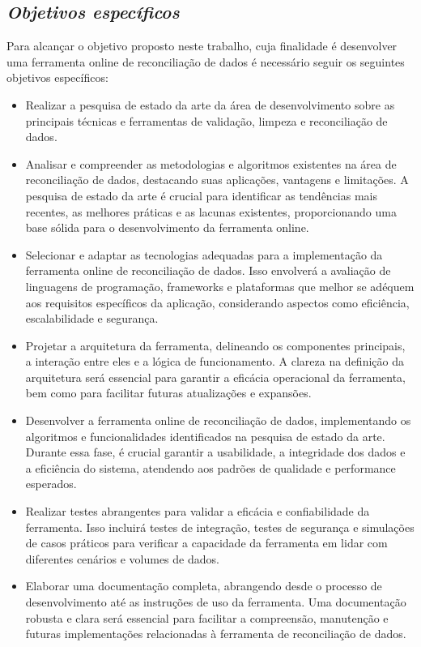 \subsection{\textit{Objetivos específicos}}

Para alcançar o objetivo proposto neste trabalho, cuja finalidade é desenvolver uma ferramenta online de reconciliação de dados é necessário seguir os seguintes objetivos específicos:

\begin{itemize}

\item Realizar a pesquisa de estado da arte da área de desenvolvimento sobre as principais técnicas e ferramentas de validação, limpeza e reconciliação de dados. 

\item Analisar e compreender as metodologias e algoritmos existentes na área de reconciliação de dados, destacando suas aplicações, vantagens e limitações. A pesquisa de estado da arte é crucial para identificar as tendências mais recentes, as melhores práticas e as lacunas existentes, proporcionando uma base sólida para o desenvolvimento da ferramenta online.

\item Selecionar e adaptar as tecnologias adequadas para a implementação da ferramenta online de reconciliação de dados. Isso envolverá a avaliação de linguagens de programação, frameworks e plataformas que melhor se adéquem aos requisitos específicos da aplicação, considerando aspectos como eficiência, escalabilidade e segurança.

\item Projetar a arquitetura da ferramenta, delineando os componentes principais, a interação entre eles e a lógica de funcionamento. A clareza na definição da arquitetura será essencial para garantir a eficácia operacional da ferramenta, bem como para facilitar futuras atualizações e expansões.

\item Desenvolver a ferramenta online de reconciliação de dados, implementando os algoritmos e funcionalidades identificados na pesquisa de estado da arte. Durante essa fase, é crucial garantir a usabilidade, a integridade dos dados e a eficiência do sistema, atendendo aos padrões de qualidade e performance esperados.

\item Realizar testes abrangentes para validar a eficácia e confiabilidade da ferramenta. Isso incluirá testes de integração, testes de segurança e simulações de casos práticos para verificar a capacidade da ferramenta em lidar com diferentes cenários e volumes de dados.

\item Elaborar uma documentação completa, abrangendo desde o processo de desenvolvimento até as instruções de uso da ferramenta. Uma documentação robusta e clara será essencial para facilitar a compreensão, manutenção e futuras implementações relacionadas à ferramenta de reconciliação de dados.
\end{itemize}

